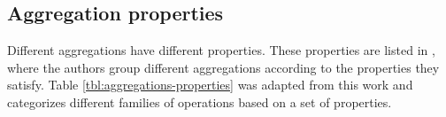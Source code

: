 
\subsection{Aggregation properties}

Different aggregations have different properties. These properties are listed in \cite{Tangwongsan-Sliding-Window-Aggregation-Algorithms}, where the authors group different aggregations according to the properties they satisfy. Table \ref{tbl:aggregations-properties} was adapted from this work and categorizes different families of operations based on a set of properties.

